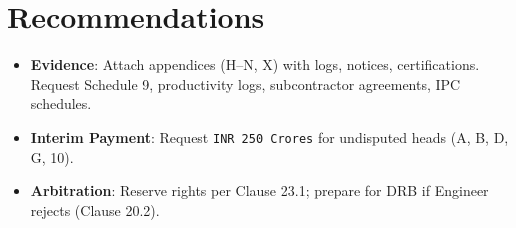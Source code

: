 \documentclass[12pt,letterpaper]{article}
\begin{document}
	\section*{Recommendations}
	\begin{itemize}
		\item \textbf{Evidence}: Attach appendices (H--N, X) with logs, notices, certifications. Request Schedule 9, productivity logs, subcontractor agreements, IPC schedules.
		\item \textbf{Interim Payment}: Request \texttt{INR 250 Crores} for undisputed heads (A, B, D, G, 10).
		\item \textbf{Arbitration}: Reserve rights per Clause 23.1; prepare for DRB if Engineer rejects (Clause 20.2).
	\end{itemize}
	
\end{document}
